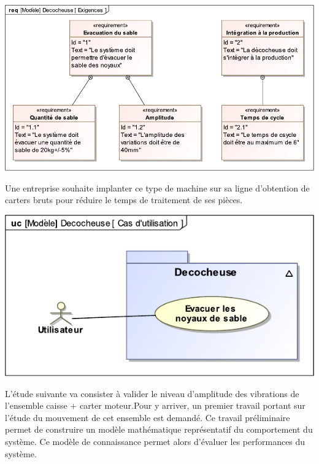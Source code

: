 \vspace{0.5cm}

\begin{minipage}{0.59\linewidth}
\begin{center}
	\includegraphics[width=0.9\linewidth]{img/Decocheuse_Exigences}
\end{center}
\end{minipage}\hfill
\begin{minipage}{0.4\linewidth}
Une entreprise souhaite implanter ce type de machine sur sa ligne d'obtention de carters bruts pour réduire le temps de traitement de ses pièces.\begin{center}
	\includegraphics[width=0.9\linewidth]{img/Decocheuse_Cas_utilisation}
\end{center}
\end{minipage}

\vspace{0.5cm}

L'étude suivante va consister à valider le niveau d'amplitude des vibrations de l'ensemble caisse + carter moteur.Pour y arriver, un premier travail portant sur l'étude du mouvement de cet ensemble est demandé. Ce travail préliminaire permet de construire un modèle mathématique représentatif du comportement du système. Ce modèle de connaissance permet alors d'évaluer les performances du système.

